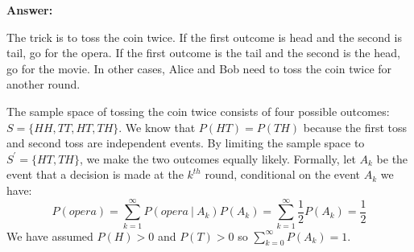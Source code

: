 \documentclass[11pt]{article}
\begin{document}
\noindent \textbf{Answer:}

The trick is to toss the coin twice. If the first outcome is head and the second is tail, go for the opera. If the first outcome is the tail and the second is the head, go for the movie. In other cases, Alice and Bob need to toss the coin twice for another round.

The sample space of tossing the coin twice consists of four possible outcomes: $S = \{HH, TT, HT, TH\}$. We know that $P(HT) = P(TH)$ because the first toss and second toss are independent events. By limiting the sample space to $S^{'} = \{HT, TH\}$, we make the two outcomes equally likely. Formally, let $A_k$ be the event that a decision is made at the $k^{th}$ round, conditional on the event $A_k$ we have:
$$P(opera) = \sum_{k=1}^{\infty} P(opera \: | \: A_k) P(A_k) = \sum_{k=1}^{\infty} \frac{1}{2} P(A_k) = \frac{1}{2}$$
We have assumed $P(H) > 0$ and $P(T) > 0$ so $\sum_{k=0}^{\infty}P(A_k) = 1$.
\end{document}
